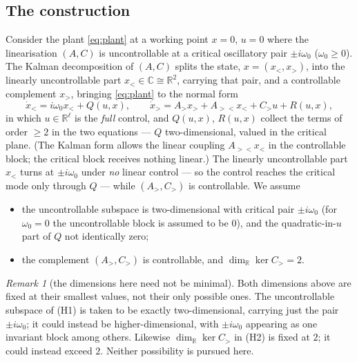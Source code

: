 \documentclass[11pt,reqno]{amsart}
\theoremstyle{plain}
\theoremstyle{definition}
\theoremstyle{remark}
\newtheorem*{remark}{Remark}
\newcommand{\R}{\mathbb{R}}
\newcommand{\C}{\mathbb{C}}
\begin{document}
\subsection{The construction}\label{sec:critical-pair}
Consider the plant \eqref{eq:plant} at a working point $x=0$, $u=0$ where the linearisation
$(A,C)$ is uncontrollable at a critical oscillatory pair $\pm i\omega_0$ ($\omega_0\ge0$). The
Kalman decomposition of $(A,C)$ splits the state, $x=(x_<,x_>)$, into the linearly uncontrollable part $x_<\in\C\cong\R^{2}$, carrying that pair, and a controllable complement $x_>$,
bringing \eqref{eq:plant} to the normal form
\begin{equation}\label{eq:split}
  \dot x_<=i\omega_0 x_<+Q(u,x),\qquad \dot x_>=A_> x_>+A_{><}x_<+C_> u+R(u,x),
\end{equation}
in which $u\in\R^{\ell}$ is the \emph{full} control, and $Q(u,x)$, $R(u,x)$ collect the terms of
order $\ge2$ in the two equations --- $Q$ two-dimensional, valued in the critical plane. (The
Kalman form allows the linear coupling $A_{><}x_<$ in the controllable block; the critical block
receives nothing linear.) The
linearly uncontrollable part $x_<$ turns at $\pm i\omega_0$ under \emph{no} linear control --- so the control
reaches the critical mode only through $Q$ --- while $(A_>,C_>)$ is controllable. We
assume
\begin{itemize}
\item[(H1)] the uncontrollable subspace is two-dimensional with critical pair $\pm i\omega_0$
  (for $\omega_0=0$ the uncontrollable block is assumed to be $0$), and the quadratic-in-$u$ part of $Q$ not identically zero;
\item[(H2)] the complement $(A_>,C_>)$ is controllable, and $\dim_{\R}\ker C_>=2$.
\end{itemize}

\begin{remark}[the dimensions here need not be minimal]
Both dimensions above are fixed at their smallest values, not their only possible ones. The
uncontrollable subspace of (H1) is taken to be exactly two-dimensional, carrying just the pair
$\pm i\omega_0$; it could instead be higher-dimensional, with $\pm i\omega_0$ appearing as one
invariant block among others. Likewise $\dim_{\R}\ker C_>$ in (H2) is fixed at $2$; it could
instead exceed $2$. Neither possibility is pursued here.
\end{remark}
\end{document}
